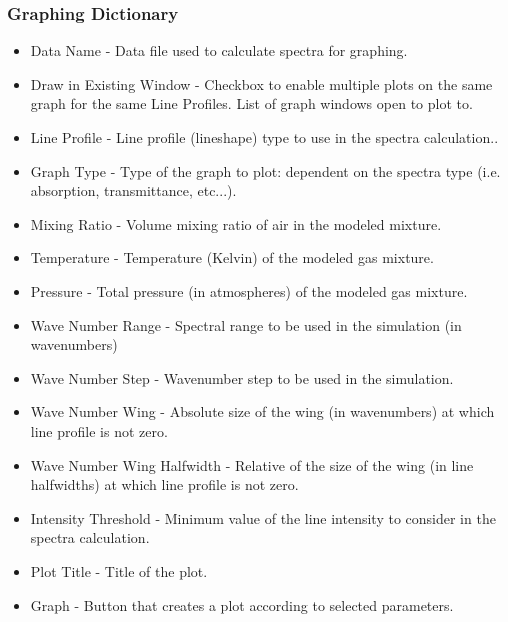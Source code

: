 \documentclass[12pt]{article}
\begin{document}
\subsubsection*{Graphing Dictionary}
\begin{itemize}
\item Data Name - Data file used to calculate spectra for graphing.
\item Draw in Existing Window - Checkbox to enable multiple plots on the same graph for the same Line Profiles. List of graph windows open to plot to.
\item Line Profile - Line profile (lineshape) type to use in the spectra calculation..
\item Graph Type - Type of the graph to plot: dependent on the spectra type (i.e. absorption, transmittance, etc...).
\item Mixing Ratio - Volume mixing ratio of air in the modeled mixture.
\item Temperature - Temperature (Kelvin) of the modeled gas mixture.
\item Pressure - Total pressure (in atmospheres) of the modeled gas mixture.
\item Wave Number Range - Spectral range to be used in the simulation (in wavenumbers)
\item Wave Number Step - Wavenumber step to be used in the simulation.
\item Wave Number Wing - Absolute size of the wing (in wavenumbers) at which line profile is not zero.
\item Wave Number Wing Halfwidth - Relative of the size of the wing (in line halfwidths) at which line profile is not zero.
\item Intensity Threshold - Minimum value of the line intensity to consider in the spectra calculation.
\item Plot Title - Title of the plot.
\item Graph - Button that creates a plot according to selected parameters.
\end{itemize}
\end{document}
